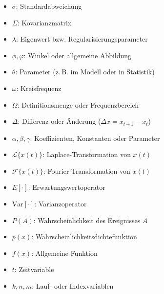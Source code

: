 \begin{itemize}[label=$\bullet$]
    \item \textbf{$\sigma$}: Standardabweichung
    \item \textbf{$\Sigma$}: Kovarianzmatrix
    \item \textbf{$\lambda$}: Eigenwert bzw. Regularisierungsparameter
    \item \textbf{$\phi, \varphi$}: Winkel oder allgemeine Abbildung
    \item \textbf{$\theta$}: Parameter (z.\,B. im Modell oder in Statistik)
    \item \textbf{$\omega$}: Kreisfrequenz
    \item \textbf{$\Omega$}: Definitionsmenge oder Frequenzbereich
    \item \textbf{$\Delta$}: Differenz oder Änderung ($\Delta x = x_{t+1}-x_t$)
    \item \textbf{$\alpha, \beta, \gamma$}: Koeffizienten, Konstanten oder Parameter
    \item \textbf{$\mathcal{L}\{x(t)\}$}: Laplace-Transformation von $x(t)$
    \item \textbf{$\mathcal{F}\{x(t)\}$}: Fourier-Transformation von $x(t)$
    \item \textbf{$E[\cdot]$}: Erwartungswertoperator
    \item \textbf{$\mathrm{Var}[\cdot]$}: Varianzoperator
    \item \textbf{$P(A)$}: Wahrscheinlichkeit des Ereignisses $A$
    \item \textbf{$p(x)$}: Wahrscheinlichkeitsdichtefunktion
    \item \textbf{$f(x)$}: Allgemeine Funktion
    \item \textbf{$t$}: Zeitvariable
    \item \textbf{$k, n, m$}: Lauf- oder Indexvariablen
\end{itemize}
